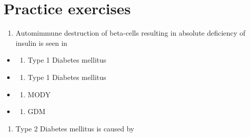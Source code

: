 \documentclass[
]{book}
\providecommand{\tightlist}{%
  \setlength{\itemsep}{0pt}\setlength{\parskip}{0pt}}
\begin{document}
\section{Practice exercises}\label{practice-exercises-5}

\begin{enumerate}
\def\labelenumi{\arabic{enumi}.}
\tightlist
\item
  Automimmune destruction of beta-cells resulting in absolute deficiency of insulin is seen in
\end{enumerate}

\begin{itemize}
\tightlist
\item
  \begin{enumerate}
  \def\labelenumi{(\Alph{enumi})}
  \tightlist
  \item
    Type 1 Diabetes mellitus\\
  \end{enumerate}
\item
  \begin{enumerate}
  \def\labelenumi{(\Alph{enumi})}
  \setcounter{enumi}{1}
  \tightlist
  \item
    Type 1 Diabetes mellitus\\
  \end{enumerate}
\item
  \begin{enumerate}
  \def\labelenumi{(\Alph{enumi})}
  \setcounter{enumi}{2}
  \tightlist
  \item
    MODY\\
  \end{enumerate}
\item
  \begin{enumerate}
  \def\labelenumi{(\Alph{enumi})}
  \setcounter{enumi}{3}
  \tightlist
  \item
    GDM
  \end{enumerate}
\end{itemize}

\begin{enumerate}
\def\labelenumi{\arabic{enumi}.}
\tightlist
\item
  Type 2 Diabetes mellitus is caused by
\end{enumerate}
\end{document}
